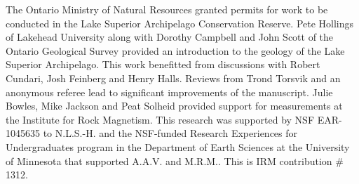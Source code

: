 \documentclass[draft,gc]{AGUTeX}
\begin{document}
\begin{article}

%
%
%
%
%
%
%

\begin{acknowledgments}
The Ontario Ministry of Natural Resources granted permits for work to be conducted in the Lake Superior Archipelago Conservation Reserve. Pete Hollings of Lakehead University along with Dorothy Campbell and John Scott of the Ontario Geological Survey provided an introduction to the geology of the Lake Superior Archipelago. This work benefitted from discussions with Robert Cundari, Josh Feinberg and Henry Halls. Reviews from Trond Torsvik and an anonymous referee lead to significant improvements of the manuscript. Julie Bowles, Mike Jackson and Peat Solheid provided support for measurements at the Institute for Rock Magnetism. This research was supported by NSF EAR-1045635 to N.L.S.-H. and the NSF-funded Research Experiences for Undergraduates program in the Department of Earth Sciences at the University of Minnesota that supported A.A.V. and M.R.M.. This is IRM contribution $\#$1312.

\end{acknowledgments}


\end{article}
\end{document}
